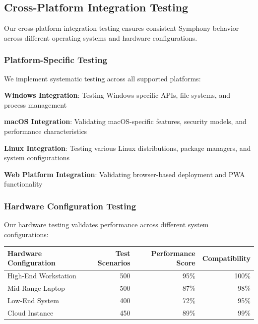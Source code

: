 \subsection*{Cross-Platform Integration Testing}

Our cross-platform integration testing ensures consistent Symphony behavior across different operating systems and hardware configurations.

\subsubsection*{Platform-Specific Testing}

We implement systematic testing across all supported platforms:

\begin{expandedlist}
    \item \textbf{Windows Integration}: Testing Windows-specific APIs, file systems, and process management
    \item \textbf{macOS Integration}: Validating macOS-specific features, security models, and performance characteristics
    \item \textbf{Linux Integration}: Testing various Linux distributions, package managers, and system configurations
    \item \textbf{Web Platform Integration}: Validating browser-based deployment and PWA functionality
\end{expandedlist}

\subsubsection*{Hardware Configuration Testing}

Our hardware testing validates performance across different system configurations:

\begin{center}
\begin{tabular}{@{}lrrr@{}}
\toprule
\textbf{Hardware Configuration} & \textbf{Test Scenarios} & \textbf{Performance Score} & \textbf{Compatibility} \\
\midrule
High-End Workstation & 500 & 95\% & 100\% \\
Mid-Range Laptop & 500 & 87\% & 98\% \\
Low-End System & 400 & 72\% & 95\% \\
Cloud Instance & 450 & 89\% & 99\% \\
\bottomrule
\end{tabular}
\end{center}

